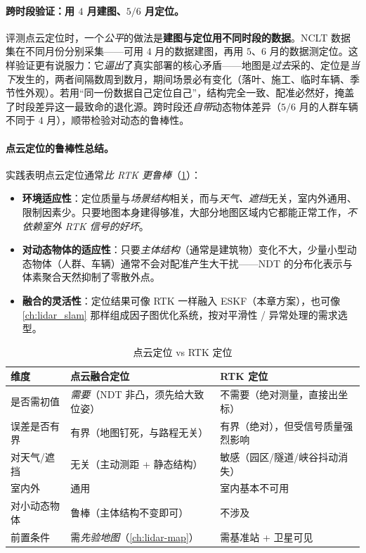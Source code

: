 \paragraph{跨时段验证：用 $4$ 月建图、$5/6$ 月定位。}
评测点云定位时，一个\emph{公平}的做法是\textbf{建图与定位用不同时段的数据}。NCLT 数据集在不同月份分别采集——可用 $4$ 月的数据建图，再用 $5$、$6$ 月的数据测定位。这样验证更有说服力：它\emph{逼出}了真实部署的核心矛盾——地图是\emph{过去}采的、定位是\emph{当下}发生的，两者间隔数周到数月，期间场景必有变化（落叶、施工、临时车辆、季节性外观）。若用“同一份数据自己定位自己”，结构完全一致、配准必然好，掩盖了时段差异这一最致命的退化源。跨时段还\emph{自带}动态物体差异（$5/6$ 月的人群车辆不同于 $4$ 月），顺带检验对动态的鲁棒性。

\paragraph{点云定位的鲁棒性总结。}
实践表明点云定位通常\emph{比 RTK 更鲁棒}（\cref{tab:lidar-loc-vs-rtk}）：
\begin{itemize}
  \item \textbf{环境适应性}：定位质量与\emph{场景结构}相关，而与\emph{天气、遮挡}无关，室内外通用、限制因素少。只要地图本身建得够准，大部分地图区域内它都能正常工作，\emph{不依赖室外 RTK 信号的好坏}。
  \item \textbf{对动态物体的适应性}：只要\emph{主体结构}（通常是建筑物）变化不大，少量小型动态物体（人群、车辆）通常不会对配准产生大干扰——NDT 的分布化表示与体素聚合天然抑制了零散外点。
  \item \textbf{融合的灵活性}：定位结果可像 RTK 一样融入 ESKF（本章方案），也可像 \cref{ch:lidar_slam} 那样组成因子图优化系统，按对平滑性 / 异常处理的需求选型。
\end{itemize}

\begin{table}[H]\centering\small
\caption{点云定位 vs RTK 定位}
\label{tab:lidar-loc-vs-rtk}
\begin{tabular}{p{} p{} p{}}
\toprule
维度 & 点云融合定位 & RTK 定位 \\
\midrule
是否需初值 & \emph{需要}（NDT 非凸，须先给大致位姿） & 不需要（绝对测量，直接出坐标） \\
误差是否有界 & 有界（地图钉死，与路程无关） & 有界（绝对），但受信号质量强烈影响 \\
对天气/遮挡 & 无关（主动测距 + 静态结构） & 敏感（园区/隧道/峡谷抖动消失） \\
室内外 & 通用 & 室内基本不可用 \\
对小动态物体 & 鲁棒（主体结构不变即可） & 不涉及 \\
前置条件 & 需\emph{先验地图}（\cref{ch:lidar-map}） & 需基准站 + 卫星可见 \\
\bottomrule
\end{tabular}
\end{table}

